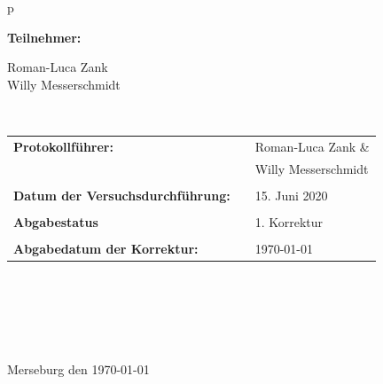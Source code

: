\begin{center}
\begin{tabular}{p{\textwidth}}
\begin{center}
\Large{\textbf{Teilnehmer:}} \\ 
\end{center}
\begin{center}
\large{	%
		Roman-Luca Zank \\
		Willy Messerschmidt \\}
\end{center}


\\

\begin{center}
\begin{tabular}{lll}
\large{\textbf{Protokollführer:}} & & \large{Roman-Luca Zank \&} \\
&& \large{Willy Messerschmidt}\\
&&\\
\large{\textbf{Datum der Versuchsdurchführung:}}&& \large{15. Juni 2020}\\
&&\\
\large{\textbf{Abgabestatus}}&& \large{1. Korrektur}\\
&&\\
\large{\textbf{Abgabedatum der Korrektur:}}&& \large{\today}
\end{tabular}
\end{center}

\\ \\ \\ \\ \\ 
\large{Merseburg den \today}

\end{tabular}
\end{center}
